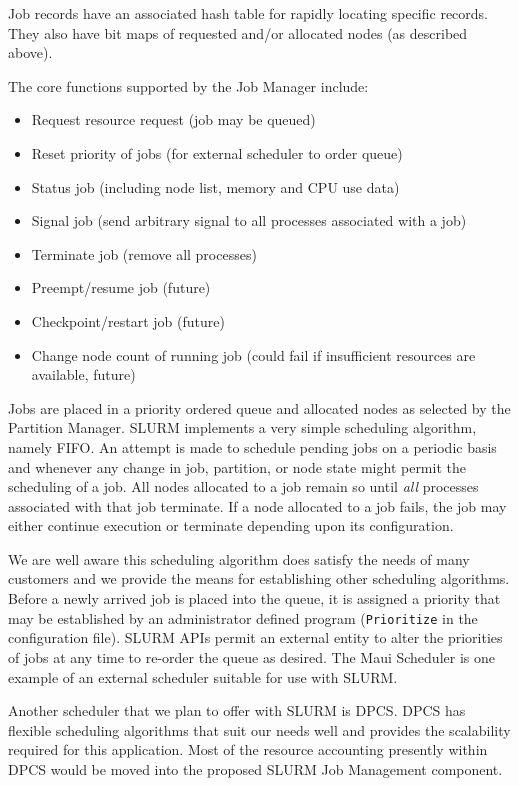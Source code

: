 Job records have an associated hash table for rapidly locating 
specific records. They also have bit maps of requested and/or 
allocated nodes (as described above).

The core functions supported by the Job Manager include:
\begin{itemize}
\item Request resource request (job may be queued)
\item Reset priority of jobs (for external scheduler to order queue)
\item Status job (including node list, memory and CPU use data)
\item Signal job (send arbitrary signal to all processes associated with a job)
\item Terminate job (remove all processes)
\item Preempt/resume job  (future)
\item Checkpoint/restart job (future)
\item Change node count of running job (could fail if insufficient 
resources are available, future)
\end{itemize}

Jobs are placed in a priority ordered queue and allocated nodes as 
selected by the Partition Manager. 
SLURM implements a very simple scheduling algorithm, namely FIFO. 
An attempt is made to schedule pending jobs on a periodic basis
and whenever any change in job, partition, or node state might permit
the scheduling of a job.  All nodes allocated to a job remain so
until {\em all} processes associated with that job terminate.  If a
node allocated to a job fails, the job may either continue execution or
terminate depending upon its configuration.

We are well aware this scheduling algorithm does satisfy the needs of many
customers and we provide the means for establishing other scheduling
algorithms. Before a newly arrived job is placed into the queue, it
is assigned a priority that may be established by an administrator
defined program ({\tt Prioritize} in the configuration file). 
SLURM APIs permit an external entity to alter the
priorities of jobs at any time to re-order the queue as desired.
The Maui Scheduler\cite{Jackson2001,Maui2002}
is one example of an external scheduler suitable for use with SLURM.

Another scheduler that we plan to offer with SLURM is
DPCS\cite{DPCS2002}.  
DPCS has flexible scheduling algorithms that suit our needs well and 
provides the scalability required for this application.
Most of the resource accounting presently within
DPCS would be moved into the proposed SLURM Job Management component.

